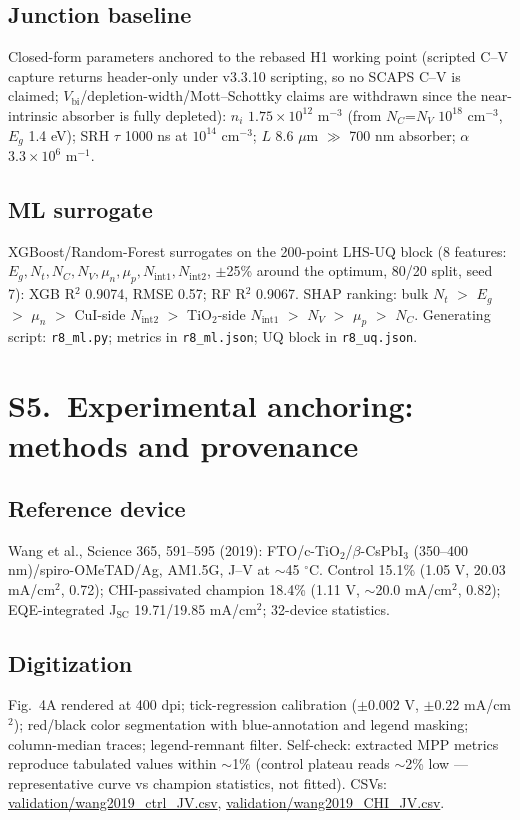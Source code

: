 \documentclass[11pt]{article}
\begin{document}
\subsection*{Junction baseline}
Closed-form parameters anchored to the rebased H1 working point (scripted C--V capture returns header-only under v3.3.10 scripting, so no SCAPS C--V is claimed; $V_{\mathrm{bi}}$/depletion-width/Mott--Schottky claims are withdrawn since the near-intrinsic absorber is fully depleted): $n_{i}$ $1.75\times10^{12}$ m$^{-3}$ (from $N_{C}$=$N_{V}$ $10^{18}$ cm$^{-3}$, $E_{g}$ 1.4 eV); SRH $\tau$ 1000 ns at $10^{14}$ cm$^{-3}$; $L$ 8.6 $\mu$m $\gg$ 700 nm absorber; $\alpha$ $3.3\times10^{6}$ m$^{-1}$.
\subsection*{ML surrogate}
XGBoost/Random-Forest surrogates on the 200-point LHS-UQ block (8 features: $E_{g},N_{t},N_{C},N_{V},\mu_{n},\mu_{p},N_{\mathrm{int1}},N_{\mathrm{int2}}$, $\pm$25\% around the optimum, 80/20 split, seed 7): XGB R$^{2}$ 0.9074, RMSE 0.57; RF R$^{2}$ 0.9067. SHAP ranking: bulk $N_{t}$ $>$ $E_{g}$ $>$ $\mu_{n}$ $>$ CuI-side $N_{\mathrm{int2}}$ $>$ TiO$_{2}$-side $N_{\mathrm{int1}}$ $>$ $N_{V}$ $>$ $\mu_{p}$ $>$ $N_{C}$. Generating script: \texttt{r8\_ml.py}; metrics in \texttt{r8\_ml.json}; UQ block in \texttt{r8\_uq.json}.

\section*{S5.\ Experimental anchoring: methods and provenance}
\subsection*{Reference device}
Wang et al., Science 365, 591--595 (2019): FTO/c-TiO$_{2}$/$\beta$-CsPbI$_{3}$ (350--400 nm)/spiro-OMeTAD/Ag, AM1.5G, J--V at $\sim$45 $^{\circ}$C. Control 15.1\% (1.05 V, 20.03 mA/cm$^{2}$, 0.72); CHI-passivated champion 18.4\% (1.11 V, $\sim$20.0 mA/cm$^{2}$, 0.82); EQE-integrated J$_{\mathrm{SC}}$ 19.71/19.85 mA/cm$^{2}$; 32-device statistics.
\subsection*{Digitization}
Fig.~4A rendered at 400 dpi; tick-regression calibration ($\pm$0.002 V, $\pm$0.22 mA/cm$^{2}$); red/black color segmentation with blue-annotation and legend masking; column-median traces; legend-remnant filter. Self-check: extracted MPP metrics reproduce tabulated values within $\sim$1\% (control plateau reads $\sim$2\% low --- representative curve vs champion statistics, not fitted). CSVs: \url{validation/wang2019_ctrl_JV.csv}, \url{validation/wang2019_CHI_JV.csv}.
\end{document}
